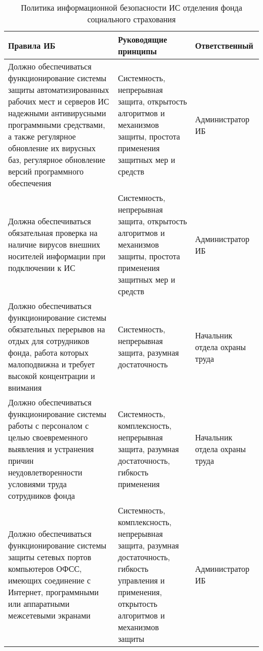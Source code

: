 \begin{table}[H]
  \caption{Политика информационной безопасности ИС отделения фонда
    социального страхования}
  \label{tab:politica_ib}
  \small
  \begin{tabular}{|p{6cm}|p{4cm}|p{4cm}|}
    \hline
    Правила ИБ & Руководящие принципы & Ответственный\\\hline
    Должно обеспечиваться функционирование системы защиты
    автоматизированных рабочих мест и серверов ИС надежными
    антивирусными программными средствами, а также регулярное
    обновление их вирусных баз, регулярное обновление версий
    программного обеспечения &
    Системность,  непрерывная защита, открытость алгоритмов и
    механизмов защиты, простота применения защитных мер и средств &
    Администратор ИБ \\\hline
    Должна обеспечиваться обязательная проверка на наличие вирусов
    внешних носителей информации при подключении к ИС &
    Системность,  непрерывная защита, открытость алгоритмов и
    механизмов защиты, простота применения защитных мер и средств &
    Администратор ИБ \\\hline
    Должно обеспечиваться функционирование системы обязательных
    перерывов на отдых для сотрудников фонда, работа которых
    малоподвижна и требует высокой концентрации и внимания &
    Системность, непрерывная защита, разумная достаточность &
    Начальник отдела охраны труда \\\hline
    Должно обеспечиваться функционирование системы работы с персоналом
    с целью своевременного выявления и устранения причин
    неудовлетворенности условиями труда сотрудников фонда &
    Системность, комплексность, непрерывная защита, разумная
    достаточность, гибкость применения &
    Начальник отдела охраны труда \\\hline
    Должно обеспечиваться функционирование системы защиты сетевых
    портов компьютеров ОФСС, имеющих соединение с Интернет,
    программными или аппаратными межсетевыми экранами &
    Системность, комплексность,  непрерывная защита, разумная
    достаточность, гибкость управления и применения,  открытость
    алгоритмов и механизмов защиты &
    Администратор ИБ \\\hline
  \end{tabular}
  \label{tab:politica_ib}
\end{table}
\normalsize  
\cleardoublepage

